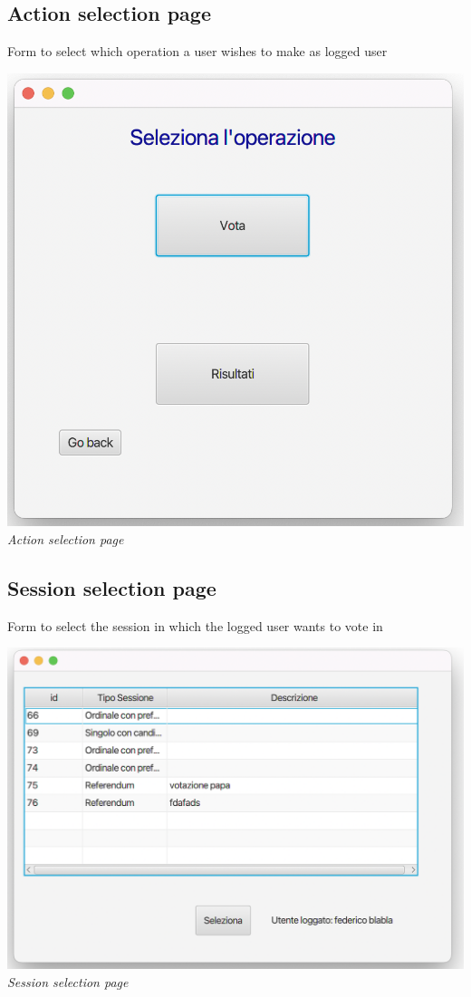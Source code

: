 \documentclass[11pt, oneside]{article}   	%
\begin{document}
\pagebreak
\subsection{Action selection page}
Form to select which operation a user wishes to make as logged user
    \begin{center}
    \includegraphics[scale=0.4]{images/ui8.png}\\
    \emph{Action selection page}
    \end{center}
\subsection{Session selection page}
Form to select the session in which the logged user wants to vote in
    \begin{center}
    \includegraphics[scale=0.5]{images/ui9.png}\\
    \emph{Session selection page}
    \end{center}
\end{document}
